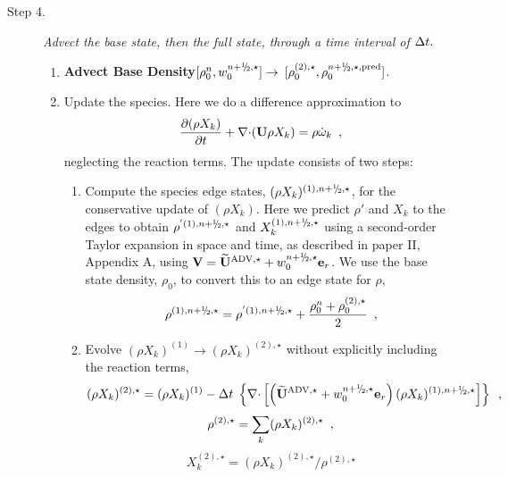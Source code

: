\begin{description}
\begin{enumerate}
\end{enumerate}

\item[Step 4.] {\em Advect the base state, then the full state, through a time interval 
of $\Delta t.$}

\begin{enumerate}
\renewcommand{\theenumi}{{\bf \alph{enumi}}}

\item {\bf Advect Base Density}$[\rhozero^{n},w_0^{\nph,\star}] \rightarrow$ 
$[\rho_0^{(2),\star}, \rho_0^{\nph,\star,{\rm pred}}]$.

\item Update the species.  Here we do a difference approximation
  to 
  \begin{equation}
  \frac{\partial (\rho X_k)}{\partial t} + \mathbf{\nabla} \mathbf{\cdot} ({\bf U} \rho X_k) =
         \rho {\dot{\omega}}_k \enskip , \label{eq:species}
  \end{equation}
  neglecting the reaction terms.  The update consists of two steps:

  \begin{enumerate}
  \renewcommand{\labelenumii}{{\bf \roman{enumii}}.}

  \item Compute the species edge states, $(\rho X_k)^{(1),\nph,\star}$,
  for the conservative update of $(\rho X_k)$. 
  Here we predict $\rho'$ and $X_k$ to the edges to obtain 
  $\rho^{'(1),\nph,\star}$ and $X_k^{(1),\nph,\star}$ using a second-order
  Taylor expansion in space and time, as described in paper II,
  Appendix A, using $\Vb = \uadvone+w_0^{\nph,\star} \er$.  We use the base
  state density, $\rho_0$, to convert this to an edge state for $\rho$,
\begin{equation}
\rho^{(1),\nph,\star} = 
\rho^{'(1),\nph,\star} + \frac{\rho_0^n + \rho_0^{(2),\star}}{2} \enskip ,
\label{eq:rhoXedgestate}
\end{equation}

  \item Evolve $(\rho X_k)^{(1)} \rightarrow (\rho X_k)^{(2),\star}$
  without explicitly including the reaction terms,
\begin{equation}
(\rho X_k)^{(2),\star} = (\rho X_k)^{(1)} 
 - \dt \; \left\{ \nablab \cdotb \left[ \left(\uadvone+w_0^{\nph,\star} \er\right)  
  (\rho X_k)^{(1),\nph,\star} \right] \right\} \enskip ,
\end{equation}
\begin{equation}
\rho^{(2),\star} = \sum_k (\rho X_k)^{(2),\star} \enskip ,
\end{equation}
\begin{equation}
X_k^{(2),\star} = (\rho X_k)^{(2),\star} / \rho^{(2),\star}
\end{equation}


\end{enumerate}
\end{enumerate}
\end{description}
